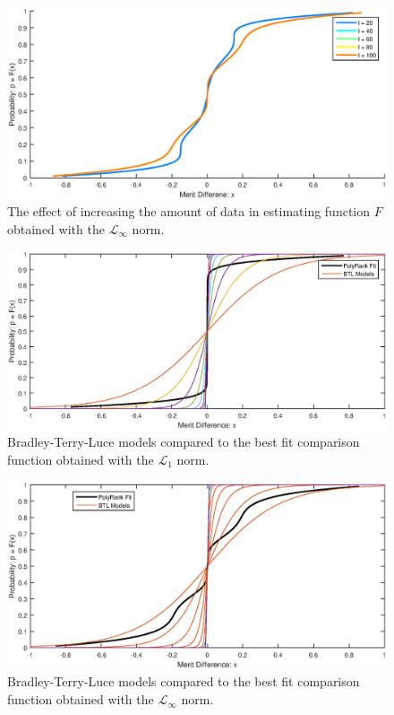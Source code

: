 \documentclass[twoside,11pt]{article}
\begin{document}
\begin{figure}
  \centering
    \includegraphics[width=1\textwidth]{Linf_figure_8}
    \caption{The effect of increasing the amount of data in estimating function $F$ obtained with the $\mathcal{L}_{\infty}$ norm. \label{Linf_figure_8}}
\end{figure}

\begin{figure}
  \centering
    \includegraphics[width=1\textwidth]{L1_figure_9}
    \caption{Bradley-Terry-Luce models compared to the best fit comparison function obtained with the $\mathcal{L}_{1}$ norm. \label{L1_figure_9}}
\end{figure}

\begin{figure}
  \centering
    \includegraphics[width=1\textwidth]{Linf_figure_9}
    \caption{Bradley-Terry-Luce models compared to the best fit comparison function obtained with the $\mathcal{L}_{\infty}$ norm. \label{Linf_figure_9}}
\end{figure}
\end{document}

